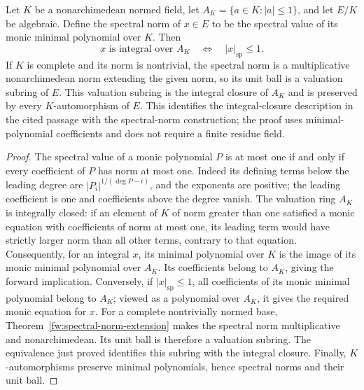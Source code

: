 \begin{lemma}
\label{fw:spectral-integers}
\leanok
Let $K$ be a nonarchimedean normed field, let
$A_K=\{a\in K:|a|\leq1\}$, and let $E/K$ be algebraic.
Define the spectral norm of $x\in E$ to be the spectral value of its
monic minimal polynomial over $K$. Then
\[
 x\text{ is integral over }A_K\quad\Longleftrightarrow\quad
 |x|_{\mathrm{sp}}\leq1.
\]
If $K$ is complete and its norm is nontrivial, the spectral norm is a
multiplicative nonarchimedean norm extending the given norm, so its
unit ball is a valuation subring of $E$. This valuation subring is the
integral closure of $A_K$ and is preserved by every $K$-automorphism of $E$.
This identifies the integral-closure description in the cited passage
with the spectral-norm construction; the proof uses minimal-polynomial
coefficients and does not require a finite residue field.
\end{lemma}
\begin{proof}
The spectral value of a monic polynomial $P$ is at most one if and only
if every coefficient of $P$ has norm at most one. Indeed its defining
terms below the leading degree are
$|P_i|^{1/(\deg P-i)}$, and the exponents are positive; the leading
coefficient is one and coefficients above the degree vanish.
The valuation ring $A_K$ is integrally closed: if an element of $K$ of
norm greater than one satisfied a monic equation with coefficients of
norm at most one, its leading term would have strictly larger norm than
all other terms, contrary to that equation.
Consequently, for an integral $x$, its minimal polynomial over $K$ is
the image of its monic minimal polynomial over $A_K$. Its coefficients
belong to $A_K$, giving the forward implication. Conversely, if
$|x|_{\mathrm{sp}}\leq1$, all coefficients of its monic minimal
polynomial belong to $A_K$; viewed as a polynomial over $A_K$, it gives
the required monic equation for $x$.
For a complete nontrivially normed base, Theorem~\ref{fw:spectral-norm-extension}
makes the spectral norm multiplicative and nonarchimedean. Its unit
ball is therefore a valuation subring. The equivalence just proved
identifies this subring with the integral closure. Finally,
$K$-automorphisms preserve minimal polynomials, hence spectral norms
and their unit ball.
\end{proof}

